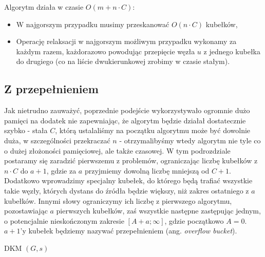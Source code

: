Algorytm działa w czasie $ O \left( m + n \cdot C \right) $:

\begin{itemize}
\item W najgorszym przypadku musimy przeskanować $ O \left( n \cdot C \right)$ kubełków,
\item Operację relaksacji w najgorszym możliwym przypadku wykonamy za każdym razem, każdorazowo powodując przepięcie węzła $u$ z jednego kubełka do drugiego (co na liście dwukierunkowej zrobimy w czasie stałym).
\end{itemize}

\subsection{Z przepełnieniem}

Jak nietrudno zauważyć, poprzednie podejście wykorzystywało ogromnie dużo pamięci na dodatek nie zapewniając, że algorytm będzie działał dostatecznie szybko - stała $C$, którą ustalaliśmy na początku algorytmu może być dowolnie duża, w szczególności przekraczać $n$ - otrzymalibyśmy wtedy algorytm nie tyle co o dużej złożoności pamięciowej, ale także czasowej. W tym podrozdziale postaramy się zaradzić pierwszemu z problemów, ograniczając liczbę kubełków z $n \cdot C$ do $a + 1$, gdzie za $a$ przyjmiemy dowolną liczbę mniejszą od $C + 1$. Dodatkowo wprowadzimy specjalny kubełek, do którego będą trafiać wszystkie takie węzły, których dystans do źródła będzie większy, niż zakres ostatniego z $a$ kubełków. Innymi słowy ograniczymy ich liczbę z pierwszego algorytmu, pozostawiając $a$ pierwszych kubełków, zaś wszystkie następne zastępując jednym, o potencjalnie nieskończonym zakresie $ \left [ A + a ; \infty \right] $, gdzie początkowo $A = 0$. $a + 1$'y kubełek będziemy nazywać przepełnieniem (ang. \textit{overflow bucket}).

\begin{algorithm}[!htbp]
\DontPrintSemicolon
{}
\caption{ DKM $\left( G, s \right)$\label{alg:OverflowBucket}}
\end{algorithm}

